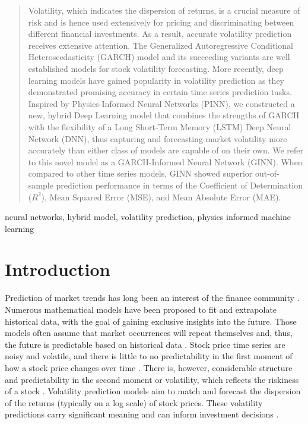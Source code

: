 \begin{abstract}
    Volatility, which indicates the dispersion of returns, is a crucial measure of risk and is hence used extensively for pricing and discriminating between different financial investments. As a result, accurate volatility prediction receives extensive attention. The Generalized Autoregressive Conditional Heteroscedasticity (GARCH) model and its succeeding variants are well established models for stock volatility forecasting. More recently, deep learning models have gained popularity in volatility prediction as they demonstrated promising accuracy in certain time series prediction tasks. Inspired by Physics-Informed Neural Networks (PINN), we constructed a new, hybrid Deep Learning model that combines the strengths of GARCH with the flexibility of a Long Short-Term Memory (LSTM) Deep Neural Network (DNN), thus capturing and forecasting market volatility more accurately than either class of models are capable of on their own. We refer to this novel model as a GARCH-Informed Neural Network (GINN). When compared to other time series models, GINN showed superior out-of-sample prediction performance in terms of the Coefficient of Determination ($R^2$), Mean Squared Error (MSE), and Mean Absolute Error (MAE). 
\end{abstract}

\begin{IEEEkeywords}
neural networks, hybrid model, volatility prediction, physics informed machine learning
\end{IEEEkeywords}

\section{Introduction}
Prediction of market trends has long been an interest of the finance community \cite{henrique_literature_2019}. Numerous mathematical models have been proposed to fit and extrapolate historical data, with the goal of gaining exclusive insights into the future. Those models often assume that market occurrences will repeat themselves and, thus, the future is predictable based on historical data \cite{abu-mostafa_introduction_1996}. Stock price time series are noisy and volatile, and there is little to no predictability in the first moment of how a stock price changes over time \cite{abu-mostafa_introduction_1996}. There is, however, considerable structure and predictability in the second moment or volatility, which reflects the riskiness of a stock \cite{kim_forecasting_2018, markowitz_portfolio_1952}. Volatility prediction models aim to match and forecast the dispersion of the returns (typically on a log scale) of stock prices. These volatility predictions carry significant meaning and can inform investment decisions \cite{kim_forecasting_2018, koo_hybrid_2022}. 

